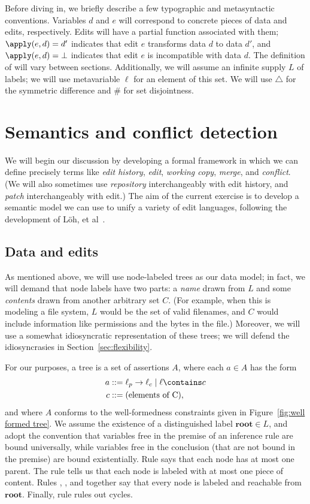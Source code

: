 \documentclass{article}
\newcommand{\mbf}[1]{\ensuremath{\mathbf{#1}}}
\newcommand{\undefined}{\ensuremath{\bot}\xspace}
\newcommand{\symdiff}{\triangle}
\renewcommand{\root}{\mbf{root}\xspace}
\begin{document}
Before diving in, we briefly describe a few typographic and metasyntactic
conventions. Variables $d$ and $e$ will correspond to concrete pieces of
data and edits, respectively. Edits will have a partial function \apply
associated with them; $\apply(e,d) = d'$ indicates that edit $e$ transforms
data $d$ to data $d'$, and $\apply(e,d) = \undefined$ indicates that edit
$e$ is incompatible with data $d$. The definition of \apply will vary
between sections.  Additionally, we will assume an infinite supply $L$ of
labels; we will use metavariable $\ell$ for an element of this set. We will
use $\symdiff$ for the symmetric difference and $\#$ for set disjointness.

\section{Semantics and conflict detection}
\label{sec:semantics}
We will begin our discussion by developing a formal framework in which we
can define precisely terms like \emph{edit history}, \emph{edit},
\emph{working copy}, \emph{merge}, and \emph{conflict}. (We will also
sometimes use \emph{repository} interchangeably with edit history, and
\emph{patch} interchangeably with edit.) The aim of the current exercise is
to develop a semantic model we can use to unify a variety of edit languages,
following the development of L\"oh, et al~\cite{loh2007principled}.

\subsection{Data and edits}

As mentioned above, we will use node-labeled trees as our data model; in
fact, we will demand that node labels have two parts: a \emph{name} drawn
from $L$ and some \emph{contents} drawn from another arbitrary set $C$. (For
example, when this is modeling a file system, $L$ would be the set of valid
filenames, and $C$ would include information like permissions and the bytes
in the file.) Moreover, we will use a somewhat idiosyncratic representation
of these trees; we will defend the idiosyncrasies in
Section~\ref{sec:flexibility}.

For our purposes, a tree is a set of assertions $A$, where each $a \in A$
has the form
\begin{align*}
    a &::= \ell_p \to \ell_c \mid \ell \contains c \\
    c &::= \mbox{(elements of C)},
\end{align*}
and where $A$ conforms to the well-formedness constraints given in
Figure~\ref{fig:well formed tree}. We assume the existence of a
distinguished label $\root \in L$, and adopt the convention that variables
free in the premise of an inference rule are bound universally, while
variables free in the conclusion (that are not bound in the premise) are
bound existentially. Rule  says that each node has at most one
parent. The  rule tells us that each node is labeled with at
most one piece of content. Rules , , and 
together say that every node is labeled and reachable from \root. Finally,
rule  rules out cycles.
\end{document}
